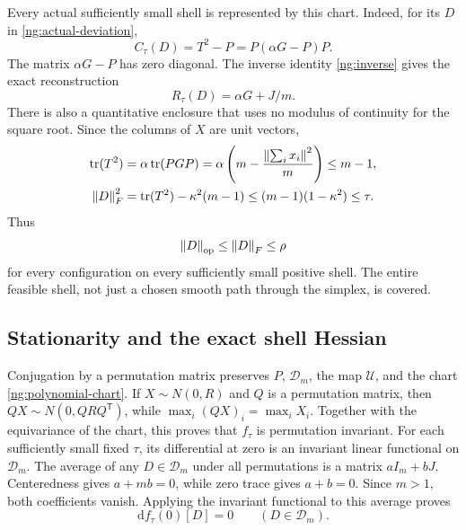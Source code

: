Every actual sufficiently small shell is represented by this chart.
Indeed, for its $D$ in \eqref{ng:actual-deviation},
\[
 C_\tau(D)=T^2-P=P(\alpha G-P)P.
\]
The matrix $\alpha G-P$ has zero diagonal. The inverse identity
\eqref{ng:inverse} gives the exact reconstruction
\begin{equation}\label{ng:reconstruction}
 R_\tau(D)=\alpha G+J/m.
\end{equation}
There is also a quantitative enclosure that uses no modulus of continuity
for the square root. Since the columns of $X$ are unit vectors,
\begin{align*}
 \operatorname{tr}(T^2)
 &=\alpha\operatorname{tr}(PGP)
   =\alpha\left(m-\frac{\left\lVert\sum_i x_i\right\rVert^2}{m}\right)
   \le m-1,\\
 \left\lVert D\right\rVert_F^2
 &=\operatorname{tr}(T^2)-\kappa^2(m-1)
   \le(m-1)(1-\kappa^2)\le\tau.
\end{align*}
Thus
\begin{equation}\label{ng:whole-shell-enclosure}
 \left\lVert D\right\rVert_{\mathrm{op}}\le\left\lVert D\right\rVert_F\le\rho
\end{equation}
for every configuration on every sufficiently small positive shell.
The entire feasible shell, not just a chosen smooth path through the
simplex, is covered.

\subsection{Stationarity and the exact shell Hessian}\label{ng:hessian}

Conjugation by a permutation matrix preserves $P$, $\mathcal D_m$,
the map $\mathcal U$, and the chart \eqref{ng:polynomial-chart}.
If $X\sim N(0,R)$ and $Q$ is a permutation matrix, then
$QX\sim N(0,QRQ^{\mathsf T})$, while $\max_i(QX)_i=\max_iX_i$.
Together with the equivariance of the chart, this proves that $f_\tau$
is permutation invariant.
For each sufficiently small fixed $\tau$, its differential at zero is
an invariant linear functional on $\mathcal D_m$. The average of any
$D\in\mathcal D_m$ under all permutations is a matrix $aI_m+bJ$.
Centeredness gives $a+mb=0$, while zero trace gives $a+b=0$.
Since $m>1$, both coefficients vanish. Applying the invariant functional
to this average proves
\begin{equation}\label{ng:stationarity}
 \mathrm d f_\tau(0)[D]=0\qquad(D\in\mathcal D_m).
\end{equation}

